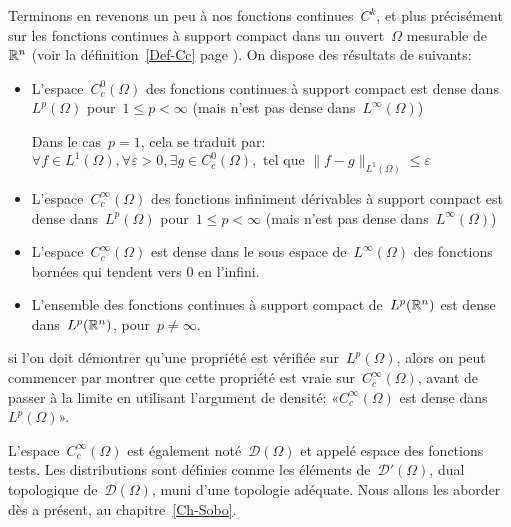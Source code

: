 \medskip
Terminons en revenons un peu à nos fonctions continues~$C^k$, et plus précisément sur les fonctions continues à support compact
dans un ouvert~$\Omega$ mesurable de~$\mathbb R^n$ (voir la définition~\ref{Def-Cc} page \pageref{Def-Cc}).
On dispose des résultats de  suivants:
\begin{itemize}
  \item L'espace~$C_c^0(\Omega)$ des fonctions continues à support compact est dense dans~$L^p(\Omega)$ pour~$1\le p<\infty$
	(mais n'est pas dense dans~$L^\infty(\Omega)$)

	 Dans le cas~$p=1$, cela se traduit par: 	$ \forall f\in L^1(\Omega), \forall\varepsilon>0, \exists g\in C_ c^0(\Omega), \text{ tel que }
	  \|f-g\|_{L^1(\Omega)}\le\varepsilon$ 

  \item L'espace~$C_c^\infty(\Omega)$ des fonctions infiniment dérivables à support compact est dense dans~$L^p(\Omega)$ pour~$1\le p<\infty$
	(mais n'est pas dense dans~$L^\infty(\Omega)$)
  \item L'espace~$C_c^\infty(\Omega)$ est dense dans le sous espace de~$L^\infty(\Omega)$ des fonctions bornées qui tendent vers 0 en l'infini.
  \item L'ensemble des fonctions continues à support compact de~$L^p(\mathbb R^n)$ est dense dans~$L^p(\mathbb R^n)$, pour~$p\neq\infty$. 
\end{itemize}

si l'on doit démontrer qu'une propriété est vérifiée sur~$L^p(\Omega)$, alors on peut commencer par montrer que cette propriété est vraie sur~$C_c^\infty(\Omega)$, avant de passer à la limite en utilisant l'argument de densité: «$C_c^\infty(\Omega)$ est dense dans~$L^p(\Omega)$».

\medskip
L'espace~$C_c^{\infty}(\Omega)$ est également noté~$\mathcal{D}(\Omega)$ et appelé espace des fonctions tests. 
Les distributions sont définies comme les éléments de~$\mathcal{D}'(\Omega)$, dual topologique de~$\mathcal{D}(\Omega)$, muni d'une topologie adéquate.
Nous allons les aborder dès a présent, au chapitre~\ref{Ch-Sobo}.
